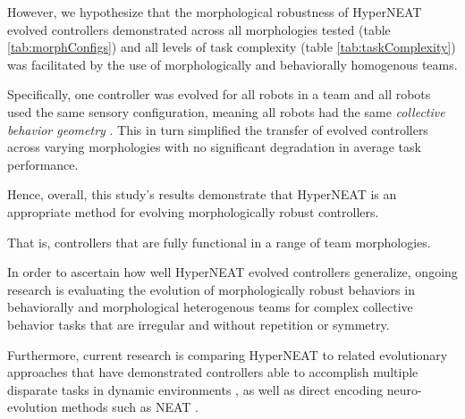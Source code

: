 However, we hypothesize that the morphological robustness of HyperNEAT evolved controllers demonstrated across all
morphologies tested (table \ref{tab:morphConfigs}) and all levels of task complexity
(table \ref{tab:taskComplexity}) was facilitated by the use of morphologically and behaviorally homogenous teams.

Specifically, one controller was evolved for all robots in a team and all robots used the same sensory configuration, meaning
all robots had the same \textit{collective behavior geometry} \cite{DAmbrosioLehmanStanley2010}.
This in turn simplified the transfer of evolved controllers across varying morphologies with no significant degradation
in average task performance.

Hence, overall, this study's results demonstrate that HyperNEAT is an appropriate method for evolving
morphologically robust controllers.  

That is, controllers that are fully functional in a range of team morphologies.

In order to ascertain how well HyperNEAT evolved controllers generalize, ongoing research is evaluating
the evolution of morphologically robust behaviors in behaviorally and morphological heterogenous teams
for complex collective behavior tasks that are irregular and without repetition or symmetry.

Furthermore, current research is comparing HyperNEAT to related evolutionary approaches that have demonstrated
controllers able to accomplish multiple disparate tasks in dynamic environments
\cite{IzquierdoTorres2008}, as well as direct encoding neuro-evolution methods such as NEAT \cite{StanleyMiikkulainen2002}.

